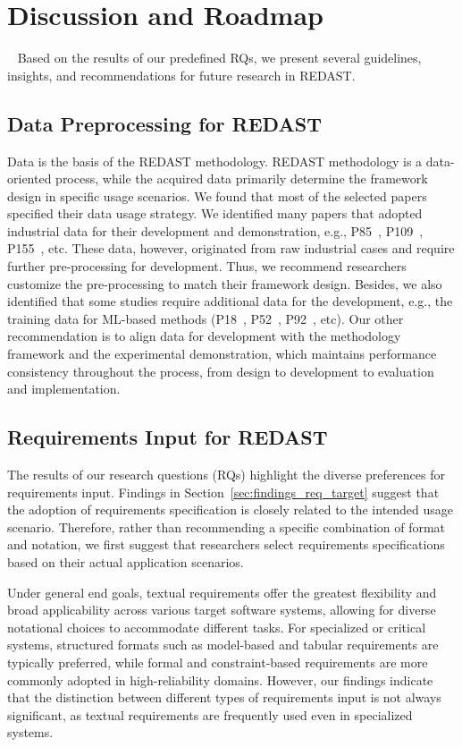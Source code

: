 \section{Discussion and Roadmap}~\label{sec:Discussion}
Based on the results of our predefined RQs, we present several guidelines, insights, and recommendations for future research in REDAST.
\subsection{Data Preprocessing for REDAST}
Data is the basis of the REDAST methodology. REDAST methodology is a data-oriented process, while the acquired data primarily determine the framework design in specific usage scenarios. We found that most of the selected papers specified their data usage strategy. We identified many papers that adopted industrial data for their development and demonstration, e.g., P85~, P109~, P155~, etc. These data, however, originated from raw industrial cases and require further pre-processing for development. Thus, we recommend researchers customize the pre-processing to match their framework design. Besides, we also identified that some studies require additional data for the development, e.g., the training data for ML-based methods (P18~, P52~, P92~, etc). Our other recommendation is to align data for development with the methodology framework and the experimental demonstration, which maintains performance consistency throughout the process, from design to development to evaluation and implementation.

\subsection{Requirements Input for REDAST}
The results of our research questions (RQs) highlight the diverse preferences for requirements input. Findings in Section~\ref{sec:findings_req_target} suggest that the adoption of requirements specification is closely related to the intended usage scenario. Therefore, rather than recommending a specific combination of format and notation, we first suggest that researchers select requirements specifications based on their actual application scenarios.

Under general end goals, textual requirements offer the greatest flexibility and broad applicability across various target software systems, allowing for diverse notational choices to accommodate different tasks. For specialized or critical systems, structured formats such as model-based and tabular requirements are typically preferred, while formal and constraint-based requirements are more commonly adopted in high-reliability domains. However, our findings indicate that the distinction between different types of requirements input is not always significant, as textual requirements are frequently used even in specialized systems.

